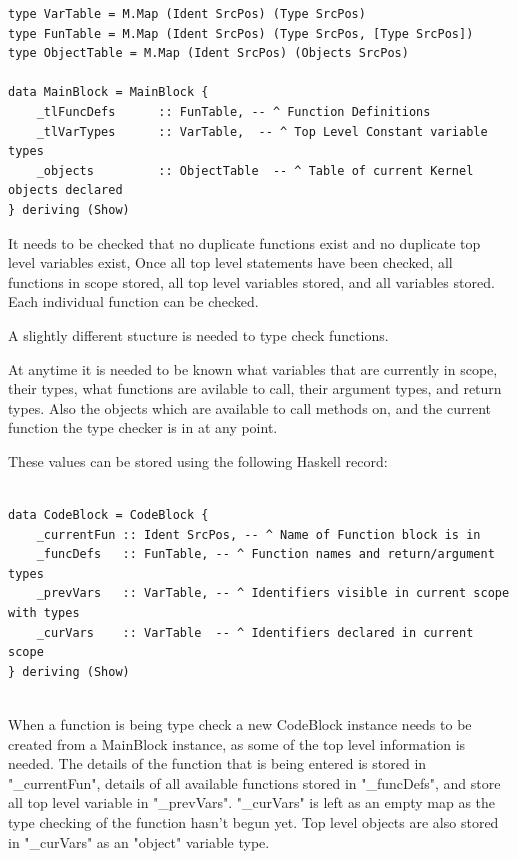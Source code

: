 \begin{lstlisting}[style=myHaskell]
type VarTable = M.Map (Ident SrcPos) (Type SrcPos)
type FunTable = M.Map (Ident SrcPos) (Type SrcPos, [Type SrcPos])
type ObjectTable = M.Map (Ident SrcPos) (Objects SrcPos)

data MainBlock = MainBlock {
    _tlFuncDefs      :: FunTable, -- ^ Function Definitions
    _tlVarTypes      :: VarTable,  -- ^ Top Level Constant variable types
    _objects         :: ObjectTable  -- ^ Table of current Kernel objects declared 
} deriving (Show)
\end{lstlisting}

It needs to be checked that no duplicate functions exist and  no duplicate top level variables exist,
Once all top level statements have been checked, all functions in scope stored, 
all top level variables stored, and all variables stored. Each individual function
can be checked.

A slightly different stucture is needed to type check functions.

At anytime it is needed to be known what variables that are currently in scope, their types,
what functions are avilable to call, their argument types, and return types. Also the
objects which are available to call methods on, and the current function the type checker
is in at any point.

These values can be stored using the following Haskell record: 

\begin{lstlisting}[style=myHaskell]

data CodeBlock = CodeBlock {
    _currentFun :: Ident SrcPos, -- ^ Name of Function block is in
    _funcDefs   :: FunTable, -- ^ Function names and return/argument types
    _prevVars   :: VarTable, -- ^ Identifiers visible in current scope with types
    _curVars    :: VarTable  -- ^ Identifiers declared in current scope
} deriving (Show)


\end{lstlisting}

When a function is being type check a new CodeBlock instance needs to be
created from a MainBlock instance, as some of the top level information is needed.
The details of the function that is being entered is stored in "\_currentFun", 
details of all available functions stored in "\_funcDefs", and store all
top level variable in "\_prevVars". "\_curVars" is left as an empty map as the
type checking of the function hasn't begun yet. Top level objects are also
stored in "\_curVars" as an "object" variable type.


